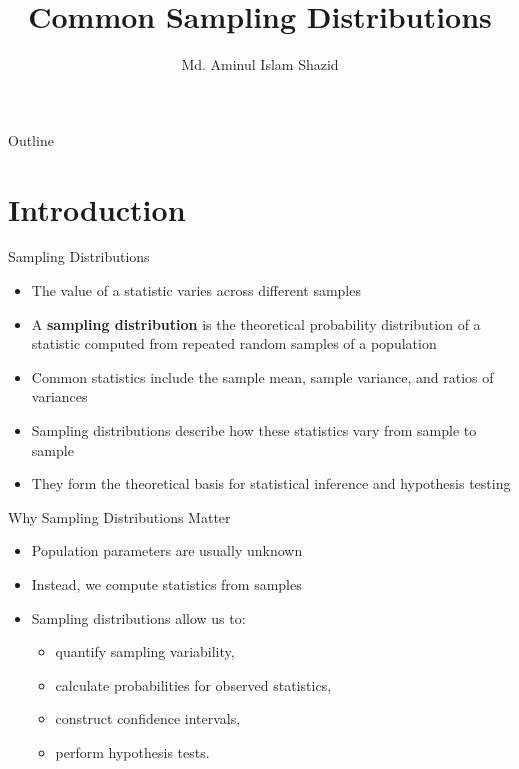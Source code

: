 \documentclass[12pt, aspectratio=169]{beamer}
\title{Common Sampling Distributions}
\author{Md. Aminul Islam Shazid}
\date{}
\begin{document}
    {
		\addtocounter{framenumber}{-2}    %

		\begin{frame}
			\titlepage
		\end{frame}

		\begin{frame}{Outline}
            \vfill
			\tableofcontents[subsectionstyle=hide]
            \vfill
		\end{frame}
	}


	\section{Introduction}
    
    \begin{frame}{Sampling Distributions}
        \begin{itemize}
            \item The value of a statistic varies across different samples
            \item A \textbf{sampling distribution} is the theoretical probability distribution of a statistic computed from repeated random samples of a population
            \item Common statistics include the sample mean, sample variance, and ratios of variances
            \item Sampling distributions describe how these statistics vary from sample to sample
            \item They form the theoretical basis for statistical inference and hypothesis testing
        \end{itemize}
    \end{frame}


    \begin{frame}{Why Sampling Distributions Matter}
        \begin{itemize}
            \item Population parameters are usually unknown
            \item Instead, we compute statistics from samples
            \item Sampling distributions allow us to:
            \begin{itemize}
                \item quantify sampling variability,
                \item calculate probabilities for observed statistics,
                \item construct confidence intervals,
                \item perform hypothesis tests.
            \end{itemize}
        \end{itemize}
    \end{frame}
\end{document}

